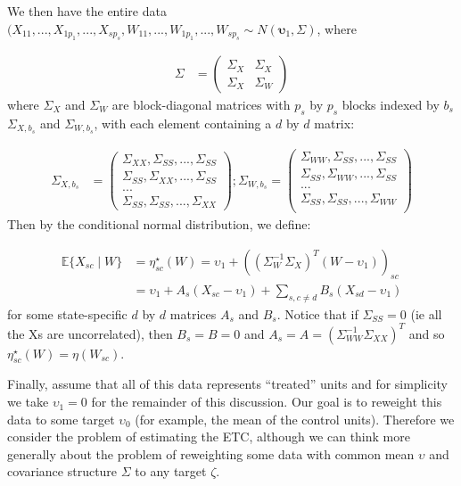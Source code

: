 We then have the entire data $(X_{11}, ..., X_{1p_1}, ..., X_{sp_s}, W_{11}, ..., W_{1p_1}, ..., W_{sp_s} \sim N(\mathbf{\upsilon}_1, \Sigma)$, where 

\begin{align*}
\Sigma &= \begin{pmatrix}
\Sigma_{X} & \Sigma_{X} \\
\Sigma_{X} & \Sigma_{W}
\end{pmatrix} 
\end{align*}
%
where $\Sigma_X$ and $\Sigma_W$ are block-diagonal matrices with $p_s$ by $p_s$ blocks indexed by $b_s$ $\Sigma_{X, b_s}$ and $\Sigma_{W, b_s}$, with each element containing a $d$ by $d$ matrix: 

\begin{align*}
\Sigma_{X, b_s} &= \begin{pmatrix}
\Sigma_{XX}, \Sigma_{SS}, ..., \Sigma_{SS} \\
\Sigma_{SS}, \Sigma_{XX}, ..., \Sigma_{SS} \\
... \\
\Sigma_{SS}, \Sigma_{SS}, ..., \Sigma_{XX}
\end{pmatrix};
\Sigma_{W, b_s} = \begin{pmatrix}
\Sigma_{WW}, \Sigma_{SS}, ..., \Sigma_{SS} \\
\Sigma_{SS}, \Sigma_{WW}, ..., \Sigma_{SS} \\
... \\
\Sigma_{SS}, \Sigma_{SS}, ..., \Sigma_{WW} \\
\end{pmatrix}
\end{align*}
%
Then by the conditional normal distribution, we define:

\begin{align*}
    \mathbb{E}\{X_{sc} \mid W\} &= \eta_{sc}^\star(W) = \upsilon_1 + ((\Sigma_W^{-1}\Sigma_X)^T(W - \upsilon_1))_{sc} \\
    &= \upsilon_1 + A_s(X_{sc} - \upsilon_1) + \sum_{s, c\ne d}B_s(X_{sd} - \upsilon_1)
\end{align*}
%
for some state-specific $d$ by $d$ matrices $A_s$ and $B_s$. Notice that if $\Sigma_{SS} = 0$ (ie all the Xs are uncorrelated), then $B_s = B = 0$ and $A_s = A = (\Sigma_{WW}^{-1}\Sigma_{XX})^T$ and so $\eta^\star_{sc}(W) = \eta(W_{sc})$.

Finally, assume that all of this data represents ``treated'' units and for simplicity we take $\upsilon_1 = 0$ for the remainder of this discussion. Our goal is to reweight this data to some target $\upsilon_0$ (for example, the mean of the control units). Therefore we consider the problem of estimating the ETC, although we can think more generally about the problem of reweighting some data with common mean $\upsilon$ and covariance structure $\Sigma$ to any target $\zeta$.

